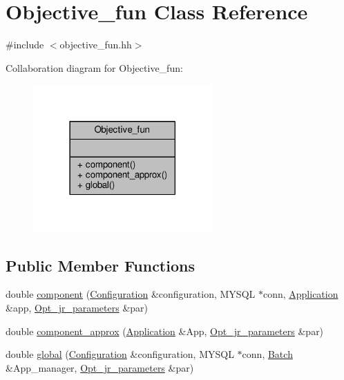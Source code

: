 \hypertarget{classObjective__fun}{\section{Objective\-\_\-fun Class Reference}
\label{classObjective__fun}
}


{\ttfamily \#include $<$objective\-\_\-fun.\-hh$>$}



Collaboration diagram for Objective\-\_\-fun\-:
\nopagebreak
\begin{figure}[H]
\begin{center}
\leavevmode
\includegraphics[width=194pt]{classObjective__fun__coll__graph}
\end{center}
\end{figure}
\subsection*{Public Member Functions}
\begin{DoxyCompactItemize}
\item 
double \hyperlink{classObjective__fun_a7d98b1f4e8a741fddc249e5134d5c3ef}{component} (\hyperlink{classConfiguration}{Configuration} \&configuration, M\-Y\-S\-Q\-L $\ast$conn, \hyperlink{classApplication}{Application} \&app, \hyperlink{classOpt__jr__parameters}{Opt\-\_\-jr\-\_\-parameters} \&par)
\item 
double \hyperlink{classObjective__fun_a551109cf9927773062e9e3668c00eb59}{component\-\_\-approx} (\hyperlink{classApplication}{Application} \&App, \hyperlink{classOpt__jr__parameters}{Opt\-\_\-jr\-\_\-parameters} \&par)
\item 
double \hyperlink{classObjective__fun_ae11b3facab75a7b7dc197d0a1a194d29}{global} (\hyperlink{classConfiguration}{Configuration} \&configuration, M\-Y\-S\-Q\-L $\ast$conn, \hyperlink{classBatch}{Batch} \&App\-\_\-manager, \hyperlink{classOpt__jr__parameters}{Opt\-\_\-jr\-\_\-parameters} \&par)
\end{DoxyCompactItemize}


